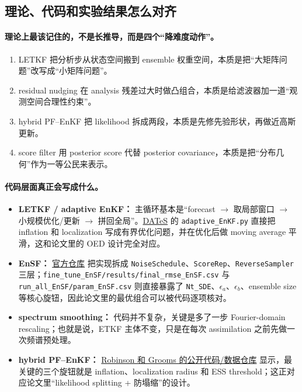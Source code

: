 \documentclass[12pt,a4paper]{ctexart}
\begin{document}
\subsection{理论、代码和实验结果怎么对齐}

\paragraph{理论上最该记住的，不是长推导，而是四个“降难度动作”。}
\begin{enumerate}
  \item LETKF 把分析步从状态空间搬到 ensemble 权重空间，本质是把“大矩阵问题”改写成“小矩阵问题”。
  \item residual nudging 在 analysis 残差过大时做凸组合，本质是给滤波器加一道“观测空间合理性约束”。
  \item hybrid PF--EnKF 把 likelihood 拆成两段，本质是先修先验形状，再做近高斯更新。
  \item score filter 用 posterior score 代替 posterior covariance，本质是把“分布几何”作为一等公民来表示。
\end{enumerate}

\paragraph{代码层面真正会写成什么。}
\begin{itemize}
  \item \textbf{LETKF / adaptive EnKF：} 主循环基本是“forecast $\rightarrow$ 取局部窗口 $\rightarrow$ 小规模优化/更新 $\rightarrow$ 拼回全局”。\href{https://bitbucket.org/a_attia/dates_adaptive}{DATeS} 的 \texttt{adaptive\_EnKF.py} 直接把 inflation 和 localization 写成有界优化问题，并在优化后做 moving average 平滑，这和论文里的 OED 设计完全对应。
  \item \textbf{EnSF：} \href{https://github.com/zezhongzhang/EnSF}{官方仓库} 把实现拆成 \texttt{NoiseSchedule}、\texttt{ScoreRep}、\texttt{ReverseSampler} 三层；\texttt{fine\_tune\_EnSF/results/final\_rmse\_EnSF.csv} 与 \texttt{run\_all\_EnSF/param\_EnSF.csv} 则直接暴露了 \texttt{Nt\_SDE}、\(\epsilon_a\)、\(\epsilon_b\)、ensemble size 等核心旋钮，因此论文里的最优组合可以被代码逐项核对。
  \item \textbf{spectrum smoothing：} 代码并不复杂，关键是多了一步 Fourier-domain rescaling；也就是说，ETKF 主体不变，只是在每次 assimilation 之前先做一次频谱预处理。
  \item \textbf{hybrid PF--EnKF：} \href{https://doi.org/10.5281/zenodo.4394312}{Robinson 和 Grooms 的公开代码/数据仓库} 显示，最关键的三个旋钮就是 inflation、localization radius 和 ESS threshold；这正对应论文里“likelihood splitting + 防塌缩”的设计。
\end{itemize}
\end{document}
